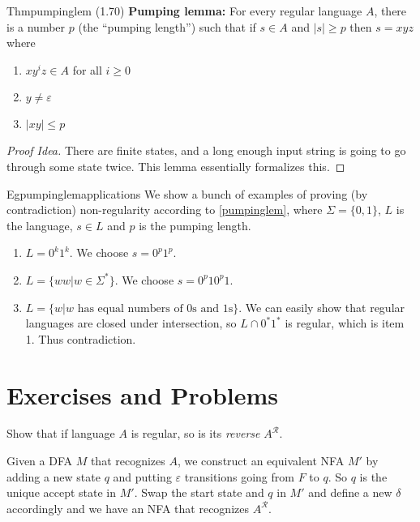 \begin{reference}{Thm}{pumpinglem}
  (1.70) \textbf{Pumping lemma:} For every regular language $A$, there is a number $p$ (the ``pumping length'') such that if $s\in A$ and $|s|\geq p$ then $s=xyz$ where
  \begin{enumerate}
    \item $xy^iz\in A$ for all $i\geq0$
    \item $y\neq \varepsilon$
    \item $|xy|\leq p$\qedhere
  \end{enumerate}
\end{reference}

\begin{proof}[Proof Idea]
  There are finite states, and a long enough input string is going to go through some state twice. This lemma essentially formalizes this.
\end{proof}

\begin{reference}{Eg}{pumpinglemapplications}
  We show a bunch of examples of proving (by contradiction) non-regularity according to \ref{pumpinglem}, where $\Sigma=\{0,1\}$, $L$ is the language, $s\in L$ and $p$ is the pumping length.
  \begin{enumerate}
    \item $L=0^k1^k$. We choose $s=0^p1^p$.
    \item $L=\{ww|w\in \Sigma^*\}$. We choose $s=0^p10^p1$.
    \item $L=\{w|w\text{ has equal numbers of $0$s and $1$s}\}$. We can easily show that regular languages are closed under intersection, so $L\cap 0^*1^*$ is regular, which is item 1. Thus contradiction.\qedhere
  \end{enumerate}
\end{reference}

\section*{Exercises and Problems}

\setcounter{exercise}{30}

\begin{exercise}{1.31}
  Show that if language $A$ is regular, so is its \textit{reverse} $A^{\mathcal{R}}$.
\end{exercise}

Given a DFA $M$ that recognizes $A$, we construct an equivalent NFA $M'$ by adding a new state $q$ and putting $\varepsilon$ transitions going from $F$ to $q$. So $q$ is the unique accept state in $M'$. Swap the start state and $q$ in $M'$ and define a new $\delta$ accordingly and we have an NFA that recognizes $A^{\mathcal{R}}$.

